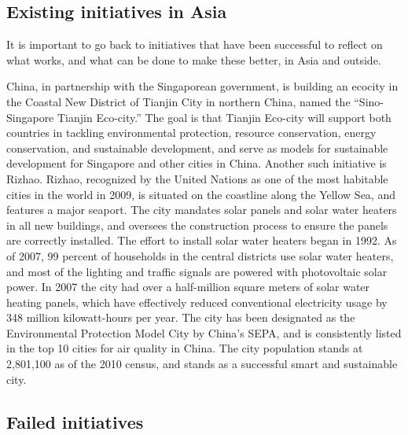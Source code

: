 \subsection{Existing initiatives in Asia}


It is important to go back to initiatives that have been successful to reflect on what works, and what can be done to make these better, in Asia and outside.

China, in partnership with the Singaporean government, is building an ecocity in the Coastal New District of Tianjin City in northern China, named the ``Sino-Singapore Tianjin Eco-city.'' The goal is that Tianjin Eco-city will support both countries in tackling environmental protection, resource conservation, energy conservation, and sustainable development, and serve as models for sustainable development for Singapore and other cities in China. Another such initiative is Rizhao. Rizhao, recognized by the United Nations as one of the most habitable cities in the world in 2009, is situated on the coastline along the Yellow Sea, and features a major seaport. The city mandates solar panels and solar water heaters in all new buildings, and oversees the construction process to ensure the panels are correctly installed.  The effort to install solar water heaters began in 1992. As of 2007, 99 percent of households in the central districts use solar water heaters, and most of the lighting and traffic signals are powered with photovoltaic solar power. In 2007 the city had over a half-million square meters of solar water heating panels, which have effectively reduced conventional electricity usage by 348 million kilowatt-hours per year. The city has been designated as the Environmental Protection Model City by China's SEPA, and is consistently listed in the top 10 cities for air quality in China.  The city population stands at 2,801,100 as of the 2010 census, and stands as a successful smart and sustainable city.

\subsection{Failed initiatives}

